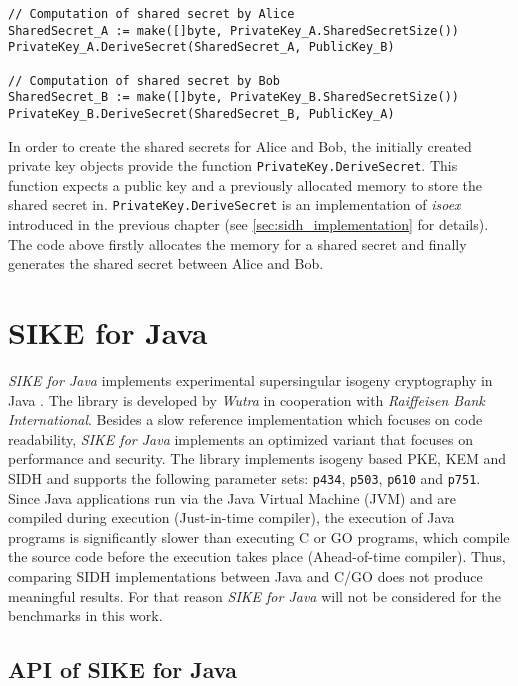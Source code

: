 \begin{lstlisting}[]
// Computation of shared secret by Alice
SharedSecret_A := make([]byte, PrivateKey_A.SharedSecretSize())
PrivateKey_A.DeriveSecret(SharedSecret_A, PublicKey_B)

// Computation of shared secret by Bob
SharedSecret_B := make([]byte, PrivateKey_B.SharedSecretSize())
PrivateKey_B.DeriveSecret(SharedSecret_B, PublicKey_A)
\end{lstlisting}
In order to create the shared secrets for Alice and Bob, the initially created private key objects provide the function \texttt{PrivateKey.DeriveSecret}. This function expects a public key and a previously allocated memory to store the shared secret in. \texttt{PrivateKey.DeriveSecret} is an implementation of \textit{isoex} introduced in the previous chapter (see \autoref{sec:sidh_implementation} for details).\\ 
The code above firstly allocates the memory for a shared secret and finally generates the shared secret between Alice and Bob.
\\
\section{SIKE for Java}
\textit{SIKE for Java} implements experimental supersingular isogeny cryptography in Java \parencite{SikeForJava2020github}. The library is developed by \textit{Wutra} in cooperation with \textit{Raiffeisen Bank International}. Besides a slow reference implementation which focuses on code readability, \textit{SIKE for Java} implements an optimized variant that focuses on performance and security. The library implements isogeny based \gls{PKE}, \gls{KEM} and \gls{SIDH} and supports the following parameter sets: \texttt{p434}, \texttt{p503}, \texttt{p610} and \texttt{p751}.\\
Since Java applications run via the Java Virtual Machine (\gls{JVM}) and are compiled during execution (Just-in-time compiler), the execution of Java programs is significantly slower than  executing C or GO programs, which compile the source code before the execution takes place (Ahead-of-time compiler). Thus, comparing SIDH implementations between Java and C/GO does not produce meaningful results. For that reason \textit{SIKE for Java} will not be considered for the benchmarks in this work.

\subsection{API of SIKE for Java}

